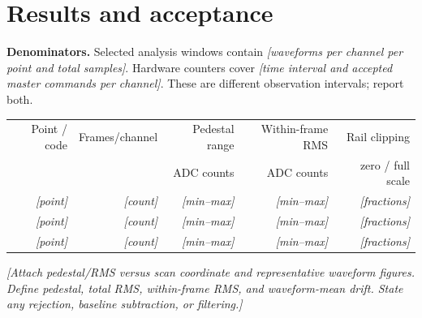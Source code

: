 \documentclass[11pt,a4paper]{article}
\newcommand{\entry}[1]{\textcolor{blue!60!black}{\textit{[#1]}}}
\begin{document}
\section{Results and acceptance}
\textbf{Denominators.} Selected analysis windows contain \entry{waveforms per channel per point and total samples}. Hardware counters cover \entry{time interval and accepted master commands per channel}. These are different observation intervals; report both.

\begin{center}\small
\begin{tabular}{@{}rrrrr@{}}\toprule
Point / code & Frames/channel & Pedestal range & Within-frame RMS & Rail clipping \\
 & & ADC counts & ADC counts & zero / full scale \\\midrule
\entry{point} & \entry{count} & \entry{min--max} & \entry{min--max} & \entry{fractions} \\
\entry{point} & \entry{count} & \entry{min--max} & \entry{min--max} & \entry{fractions} \\
\entry{point} & \entry{count} & \entry{min--max} & \entry{min--max} & \entry{fractions} \\
\bottomrule\end{tabular}
\end{center}

\entry{Attach pedestal/RMS versus scan coordinate and representative waveform figures. Define pedestal, total RMS, within-frame RMS, and waveform-mean drift. State any rejection, baseline subtraction, or filtering.}
\end{document}

